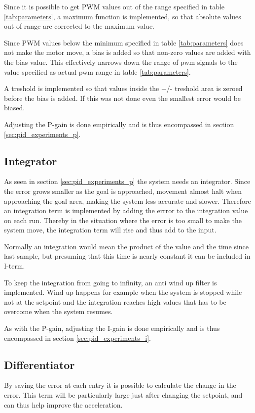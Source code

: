 Since it is possible to get PWM values out of the range specified in table \ref{tab:parameters}, a maximum function is implemented, so that absolute values out of range are corrected to the maximum value.

Since PWM values below the minimum specified in table \ref{tab:parameters} does not make the motor move, a bias is added so that non-zero values are added with the bias value. This effectively narrows down the range of pwm signals to the value specified as actual pwm range in table \ref{tab:parameters}. 

A treshold is implemented so that values inside the +/- treshold area is zeroed before the bias is added. If this was not done even the smallest error would be biased.

Adjusting the P-gain is done empirically and is thus encompassed in section \ref{sec:pid_experiments_p}.

\subsection{Integrator}\label{sec:integrator}
As seen in section \ref{sec:pid_experiments_p} the system needs an integrator. Since the error grows smaller as the goal is approached, movement almost halt when approaching the goal area, making the system less accurate and slower. Therefore an integration term is implemented by adding the errror to the integration value on each run. Thereby in the situation where the error is too small to make the system move, the integration term will rise and thus add to the input. 

Normally an integration would mean the product of the value and the time since last sample, but presuming that this time is nearly constant it can be included in I-term. 

To keep the integration from going to infinity, an anti wind up filter is implemented. Wind up happens for example when the system is stopped while not at the setpoint and the integration reaches high values that has to be overcome when the system resumes.

As with the P-gain, adjusting the I-gain is done empirically and is thus encompassed in section \ref{sec:pid_experiments_i}.

\subsection{Differentiator}
By saving the error at each entry it is possible to calculate the change in the error. This term will be particularly large just after changing the setpoint, and can thus help improve the acceleration. 

